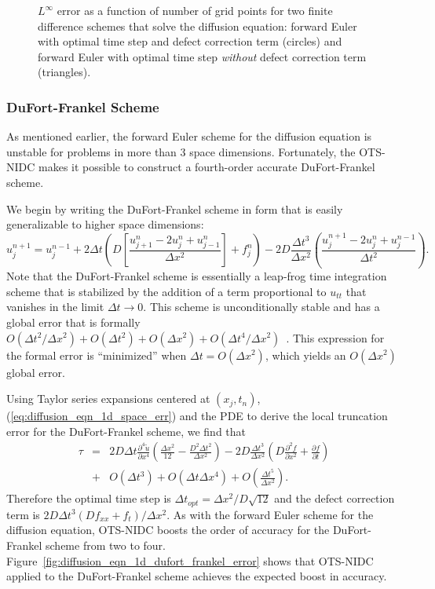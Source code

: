 \documentclass[fleqn,12pt,twoside]{article}
\newcommand{\beq}{\begin{equation}}
\newcommand{\eeq}{\end{equation}}
\newcommand{\bea}{\begin{eqnarray}}
\newcommand{\eea}{\end{eqnarray}}
\def\pt{\partial t}
\def\px{\partial x}
\def\tu{\tilde{u}}
\def\dt{\Delta t}
\def\dx{\Delta x}
\def\dto{\dt_{opt}}
\begin{document}
\begin{figure}[tb]
\begin{center}
\caption{$L^\infty$ error as a function of number of grid points for 
two finite difference schemes that solve the diffusion equation: 
forward Euler with optimal time step and defect correction term (circles) and 
forward Euler with optimal time step \emph{without} defect correction term 
(triangles).  
}
\label{fig:diffusion_eqn_1d_src_error}
\end{center}
\end{figure}


\subsubsection{DuFort-Frankel Scheme \label{sec:dufort_frankel}}
As mentioned earlier, the forward Euler scheme for the diffusion equation is
unstable for problems in more than 3 space dimensions.  Fortunately, the 
OTS-NIDC makes it possible to construct a fourth-order accurate 
DuFort-Frankel scheme. 

We begin by writing the DuFort-Frankel scheme in form that is easily 
generalizable to higher space dimensions:
\beq
  u^{n+1}_j = u^{n-1}_j 
  + 2 \dt 
    \left( D \left[\frac{u^{n}_{j+1} -2 u^{n}_j + u^{n}_{j-1}}{\dx^2}\right] 
         + f^n_j \right)
  - 2 D \frac{\dt^3}{\dx^2}
    \left( \frac{u^{n+1}_j -2 u^{n}_j + u^{n-1}_j}{\dt^2}\right).
  \label{eq:diffusion_eqn_1d_DF_scheme}
\eeq
Note that the DuFort-Frankel scheme is essentially a leap-frog time integration 
scheme that is stabilized by the addition of a term proportional to $u_{tt}$
that vanishes in the limit $\dt \rightarrow 0$.  This scheme is 
unconditionally stable and has a global error that is formally 
$O(\dt^2/\dx^2) + O(\dt^2) + O(\dx^2) + O(\dt^4/\dx^2)$~\cite{gko_book}.  
This expression for the formal error is ``minimized'' when $\dt = O(\dx^2)$, 
which yields an $O(\dx^2)$ global error.

Using Taylor series expansions centered at $(x_j, t_n)$, 
(\ref{eq:diffusion_eqn_1d_space_err}) and the PDE to derive the local 
truncation error for the DuFort-Frankel scheme, we find that 
\bea
  \tau &=& 2D \dt \frac{\partial^4 \tu}{\px^4}
  \left(\frac{\dx^2}{12} - \frac{D^2 \dt^2}{\dx^2} \right)
  - 2 D \frac{\dt^3}{\dx^2} \left(D \frac{\partial^2 f}{\px^2}  
                                 + \frac{\partial f}{\pt} \right)
  \nonumber \\
  &+& O(\dt^3) + O(\dt \dx^4) + O\left(\frac{\dt^5}{\dx^2} \right).
\eea
Therefore the optimal time step is $\dto = \dx^2/D\sqrt{12}$ and the defect
correction term is $2 D \dt^3 \left(D f_{xx} + f_{t} \right)/\dx^2$.  As with 
the forward Euler scheme for the diffusion equation, OTS-NIDC boosts the
order of accuracy for the DuFort-Frankel scheme from two to four.  
Figure~\ref{fig:diffusion_eqn_1d_dufort_frankel_error} shows that OTS-NIDC
applied to the DuFort-Frankel scheme achieves the expected boost in accuracy. 
\end{document}
